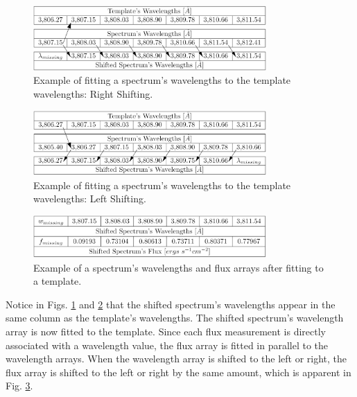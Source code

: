\documentclass[conference]{IEEEtran}
\begin{document}
        \begin{figure}
            \centering
            \includegraphics[width=3.5in]{figure3.png}
            \caption{Example of fitting a spectrum's wavelengths to the template wavelengths: Right Shifting.}
            \label{fig:right}
        \end{figure}

        \begin{figure}
            \centering
            \includegraphics[width=3.5in]{figure4.png}
            \caption{Example of fitting a spectrum's wavelengths to the template wavelengths: Left Shifting.}
            \label{fig:left}
        \end{figure}

	\begin{figure}
            \centering
            \includegraphics[width=3.5in]{figure5.png}
            \caption{Example of a spectrum's wavelengths and flux arrays after fitting to a template.}
            \label{fig:miss-f}
        \end{figure}
        
        Notice in Figs. \ref{fig:right} and \ref{fig:left} that the shifted spectrum's wavelengths appear in the same column as the template's wavelengths. The shifted spectrum's wavelength array is now fitted to the template. Since each flux measurement is directly associated with a wavelength value, the flux array is fitted in parallel to the wavelength arrays. When the wavelength array is shifted to the left or right, the flux array is shifted to the left or right by the same amount, which is apparent in Fig. \ref{fig:miss-f}.  

\end{document}
